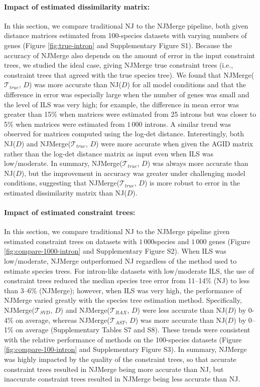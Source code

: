 \paragraph{Impact of estimated dissimilarity matrix:}
In this section, we compare traditional NJ to the NJMerge pipeline, both given distance matrices estimated from 100-species datasets with varying numbers of genes (Figure \ref{fig:true-intron} and Supplementary Figure S1).
Because the accuracy of NJMerge also depends on the amount of error in the input constraint trees, we studied the ideal case, giving NJMerge true constraint trees (i.e., constraint trees that agreed with the true species tree).
We found that NJMerge($\mathcal{T}_{true}$, $D$) was more accurate than NJ($D$) for all model conditions and that the difference in error was especially large when the number of genes was small and the level of ILS was very high; for example, the difference in mean error was greater than 15\% when matrices were estimated from 25 introns but was closer to 5\% when matrices were estimated from $1\,000$ introns.
A similar trend was observed for matrices computed using the log-det distance.
Interestingly, both NJ($D$) and NJMerge($\mathcal{T}_{true}$, $D$) were more accurate when given the AGID matrix rather than the log-det distance matrix as input even when ILS was low/moderate.
In summary, NJMerge($\mathcal{T}_{true}$, $D$) was always more accurate than NJ($D$), but the improvement in accuracy was greater under challenging model conditions, suggesting that NJMerge($\mathcal{T}_{true}$, $D$) is more robust to error in the estimated dissimilarity matrix than NJ($D$).

\paragraph{Impact of estimated constraint trees:}
In this section, we compare traditional NJ to the NJMerge pipeline given estimated constraint trees on datasets with $1\,000 $species and $1\,000$ genes (Figure \ref{fig:compare-1000-intron} and Supplementary Figure S2).
When ILS was low/moderate, NJMerge outperformed NJ regardless of the method used to estimate species trees.
For intron-like datasets with low/moderate ILS, the use of constraint trees reduced the median species tree error from 11--14\% (NJ) to less than 3--6\% (NJMerge); however, when  ILS was very high, the performance of NJMerge varied greatly with the species tree estimation method.
Specifically, NJMerge($\mathcal{T}_{SVD}$, $D$) and NJMerge($\mathcal{T}_{RAX}$, $D$) were less accurate than NJ($D$) by 0-4\% on average, whereas NJMerge($\mathcal{T}_{AST}$, $D$) was more accurate than NJ($D$) by 0--1\% on average (Supplementary Tables S7 and S8).
These trends were consistent with the relative performance of methods on the 100-species datasets (Figure \ref{fig:compare-100-intron} and Supplementary Figure S3).
In summary, NJMerge was highly impacted by the quality of the constraint trees, so that accurate constraint trees resulted in NJMerge being more accurate than NJ, but inaccurate constraint trees resulted in NJMerge being less accurate than NJ.

